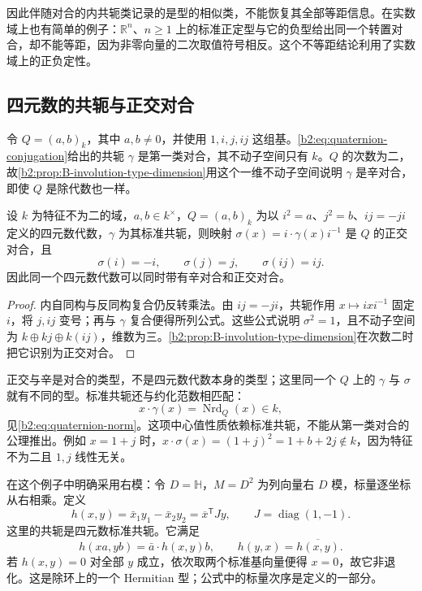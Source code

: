 因此伴随对合的内共轭类记录的是型的相似类，不能恢复其全部等距信息。在实数域上也有简单的例子：\(\mathbb R^n\)、\(n\ge1\) 上的标准正定型与它的负型给出同一个转置对合，却不能等距，因为非零向量的二次取值符号相反。这个不等距结论利用了实数域上的正负定性。

\subsection{四元数的共轭与正交对合}
\label{b2:subsec:B03:03}

令 \(Q=(a,b)_k\)，其中 \(a,b\ne0\)，并使用 \(1,i,j,ij\) 这组基。\eqref{b2:eq:quaternion-conjugation}给出的共轭 \(\gamma\) 是第一类对合，其不动子空间只有 \(k\)。\(Q\) 的次数为二，故\cref{b2:prop:B-involution-type-dimension}用这个一维不动子空间说明 \(\gamma\) 是辛对合，即使 \(Q\) 是除代数也一样。

\begin{proposition}\label{b2:prop:B-quaternion-orthogonal-involution}
	设 \(k\) 为特征不为二的域，\(a,b\in k^\times\)，\(Q=(a,b)_k\) 为以 \(i^2=a\)、\(j^2=b\)、\(ij=-ji\) 定义的四元数代数，\(\gamma\) 为其标准共轭，则映射 \(\sigma(x)=i\cdot\gamma(x)i^{-1}\) 是 \(Q\) 的正交对合，且
	\[
		\sigma(i)=-i,\qquad \sigma(j)=j,\qquad \sigma(ij)=ij.
	\]
	因此同一个四元数代数可以同时带有辛对合和正交对合。
\end{proposition}
\begin{proof}
	内自同构与反同构复合仍反转乘法。由 \(ij=-ji\)，共轭作用 \(x\mapsto ixi^{-1}\) 固定 \(i\)，将 \(j,ij\) 变号；再与 \(\gamma\) 复合便得所列公式。这些公式说明 \(\sigma^2=1\)，且不动子空间为 \(k\oplus kj\oplus k(ij)\)，维数为三。\cref{b2:prop:B-involution-type-dimension}在次数二时把它识别为正交对合。
\end{proof}

正交与辛是对合的类型，不是四元数代数本身的类型；这里同一个 \(Q\) 上的 \(\gamma\) 与 \(\sigma\) 就有不同的型。标准共轭还与约化范数相匹配：
\[
	x\cdot\gamma(x)=\operatorname{Nrd}_Q(x)\in k,
\]
见\eqref{b2:eq:quaternion-norm}。这项中心值性质依赖标准共轭，不能从第一类对合的公理推出。例如 \(x=1+j\) 时，\(x\cdot\sigma(x)=(1+j)^2=1+b+2j\notin k\)，因为特征不为二且 \(1,j\) 线性无关。

\begin{example}\label{b2:exm:B-quaternion-hermitian-right-module}
	在这个例子中明确采用右模：令 \(D=\mathbb H\)，\(M=D^2\) 为列向量右 \(D\) 模，标量逐坐标从右相乘。定义
	\[
		h(x,y)=\bar x_1y_1-\bar x_2y_2 =\overline x^{\mathsf T}Jy,\qquad J=\operatorname{diag}(1,-1).
	\]
	这里的共轭是四元数标准共轭。它满足
	\[
		h(xa,yb)=\bar a\cdot h(x,y)b,\qquad h(y,x)=\overline{h(x,y)}.
	\]
	若 \(h(x,y)=0\) 对全部 \(y\) 成立，依次取两个标准基向量便得 \(x=0\)，故它非退化。这是除环上的一个 Hermitian 型；公式中的标量次序是定义的一部分。
\end{example}

